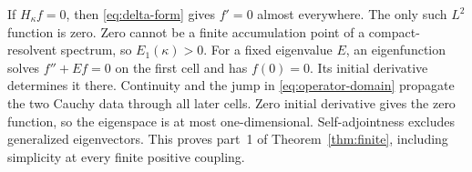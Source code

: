 If $H_\kappa f=0$, then \eqref{eq:delta-form} gives
$f'=0$ almost everywhere. The only such $L^2$ function is zero.
Zero cannot be a finite accumulation point of a
compact-resolvent spectrum, so $E_1(\kappa)>0$.
For a fixed eigenvalue $E$, an eigenfunction solves
$f''+Ef=0$ on the first cell and has $f(0)=0$.
Its initial derivative determines it there.
Continuity and the jump in \eqref{eq:operator-domain} propagate
the two Cauchy data through all later cells.
Zero initial derivative gives the zero function, so the
eigenspace is at most one-dimensional.
Self-adjointness excludes generalized eigenvectors.
This proves part~1 of Theorem~\ref{thm:finite}, including
simplicity at every finite positive coupling.
